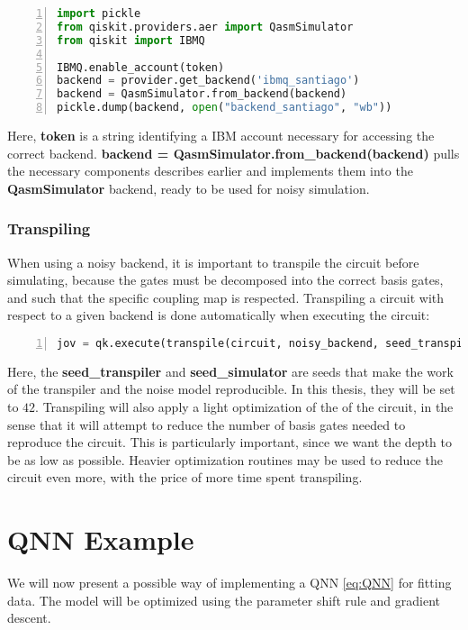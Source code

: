 \begin{lstlisting}[language=python, numbers=left]
import pickle
from qiskit.providers.aer import QasmSimulator
from qiskit import IBMQ

IBMQ.enable_account(token)
backend = provider.get_backend('ibmq_santiago')
backend = QasmSimulator.from_backend(backend)
pickle.dump(backend, open("backend_santiago", "wb"))
\end{lstlisting}

Here, \textbf{token} is a string identifying a IBM account necessary for accessing the correct backend. 
\textbf{backend = QasmSimulator.from\_backend(backend)} pulls the necessary components describes earlier and implements them into the \textbf{QasmSimulator} backend, ready to be used for noisy simulation. 

\subsubsection*{Transpiling}
When using a noisy backend, it is important to transpile the circuit before simulating, because the gates must be decomposed into the correct basis gates, and such that the specific coupling map is respected. Transpiling a circuit with respect to a given backend is done automatically when executing the circuit:

\begin{lstlisting}[language=python, numbers=left]
jov = qk.execute(transpile(circuit, noisy_backend, seed_transpiler=42, seed_simulator=42)
\end{lstlisting}
Here, the \textbf{seed\_transpiler} and \textbf{seed\_simulator} are seeds that make the work of the transpiler and the noise model reproducible. In this thesis, they will be set to $42$. Transpiling will also apply a light optimization of the of the circuit, in the sense that it will attempt to reduce the number of basis gates needed to reproduce the circuit. This is particularly important, since we want the depth to be as low as possible. Heavier optimization routines may be used to reduce the circuit even more, with the price of more time spent transpiling.  






\section{QNN Example}\label{sec:QNNimpement}
We will now present a possible way of implementing a QNN \autoref{eq:QNN} for fitting data. The model will be optimized using the parameter shift rule and gradient descent. 

